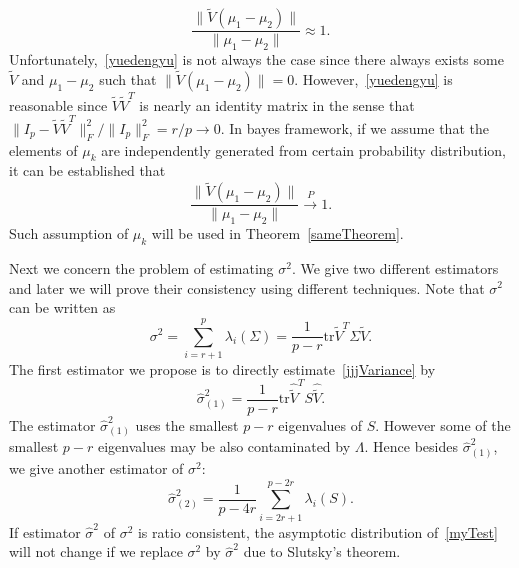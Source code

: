 \documentclass[review]{elsarticle}
\theoremstyle{plain}
\theoremstyle{definition}
\theoremstyle{remark}
\begin{document}
\begin{equation}\label{yuedengyu}
    \frac{\|\tilde{V}(\mu_1-\mu_2)\|}{\|\mu_1-\mu_2\|}\approx 1.
\end{equation}
Unfortunately,~\eqref{yuedengyu}
is not always the case since there always exists some
$\tilde{V}$ and $\mu_1-\mu_2$ such that $\|\tilde{V}(\mu_1-\mu_2)\|=0$.
However,~\eqref{yuedengyu} is reasonable since $\tilde{V}\tilde{V}^T$ is nearly an identity matrix in the sense that
    ${\|I_p-\tilde{V}\tilde{V}^T\|_F^2}/{\|I_p\|_F^2}=r/p\to 0$. 
In bayes framework, if we assume that the elements of $\mu_k$ are independently generated from certain probability distribution, it can be established that 
\begin{equation*}
    \frac{\|\tilde{V}(\mu_1-\mu_2)\|}{\|\mu_1-\mu_2\|}\xrightarrow{P}1.
\end{equation*}
Such assumption of $\mu_k$ will be used in Theorem~\ref{sameTheorem}.


Next we concern the problem of estimating $\sigma^2$. We give two different estimators and later we will prove their consistency using different techniques. Note that $\sigma^2$ can be written as
\begin{equation}\label{jjjVariance}
    \sigma^2=\sum_{i=r+1}^{p}\lambda_i(\Sigma)=\frac{1}{p-r}\mathrm{tr}\tilde{V}^T\Sigma\tilde{V}.
\end{equation}
The first estimator we propose is to directly estimate~\eqref{jjjVariance} by
\begin{equation*}
    \hat{\sigma}^2_{(1)}=\frac{1}{p-r}\mathrm{tr}\hat{\tilde{V}}^T S\hat{\tilde{V}}.
\end{equation*}
The estimator $\hat{\sigma}^2_{(1)}$ uses the smallest $p-r$ eigenvalues of $S$. However some of the smallest $p-r$ eigenvalues may be also contaminated by $\Lambda$. Hence besides $\hat{\sigma}^2_{(1)}$, we give another estimator of $\sigma^2$:
\begin{equation*}
    \hat{\sigma}^2_{(2)}=\frac{1}{p-4r}\sum_{i=2r+1}^{p-2r} \lambda_i(S).
\end{equation*}
If estimator $\hat{\sigma}^2$ of $\sigma^2$ is ratio consistent, the asymptotic distribution of~\eqref{myTest} will not change if we replace $\sigma^2$ by $\hat{\sigma}^2$  due to Slutsky's theorem.

\end{document}
